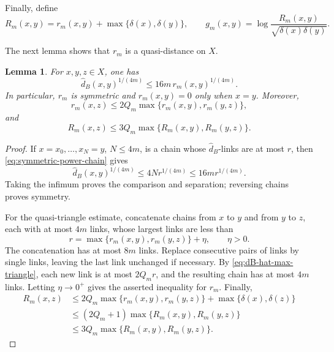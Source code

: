 \documentclass[11pt]{article}
\newtheorem{lemma}[theorem]{Lemma}
\theoremstyle{definition}
\begin{document}
Finally, define
\[
R_m(x,y)
=
r_m(x,y)+\max\{\delta(x),\delta(y)\},
\qquad
g_m(x,y)
=
\log\frac{R_m(x,y)}
{\sqrt{\delta(x)\delta(y)}}.
\]

The next lemma shows that \(r_m\)  is a quasi-distance on \(X\).



\begin{lemma}\label{lem:chain-estimates}
For \(x,y,z\in X\), one has
\[
\widehat d_B(x,y)^{1/(4m)}
\le16m\,r_m(x,y)^{1/(4m)}.
\]
In particular, \(r_m\) is symmetric and \(r_m(x,y)=0\) only when \(x=y\).
Moreover,
\[
r_m(x,z)\le2Q_m\max\{r_m(x,y),r_m(y,z)\},
\]
and
\[
R_m(x,z)\le3Q_m\max\{R_m(x,y),R_m(y,z)\}.
\]
\end{lemma}
\begin{proof}
If \(x=x_0,\ldots,x_N=y\), \(N\le4m\), is a chain whose
\(\widehat d_B\)-links are at most \(r\), then
\eqref{eq:symmetric-power-chain} gives
\[
\widehat d_B(x,y)^{1/(4m)}
\le4N r^{1/(4m)}\le16m r^{1/(4m)}.
\]
Taking the infimum proves the comparison and separation; reversing
chains proves symmetry.

For the quasi-triangle estimate, concatenate chains from \(x\) to \(y\)
and from \(y\) to \(z\), each with at most \(4m\) links, whose largest
links are less than
\[
r=\max\{r_m(x,y),r_m(y,z)\}+\eta,\qquad \eta>0.
\]
The concatenation has at most \(8m\) links. Replace consecutive pairs
of links by single links, leaving the last link unchanged if necessary.
By \eqref{eq:dB-hat-max-triangle}, each new link is at most \(2Q_mr\),
and the resulting chain has at most \(4m\) links. Letting \(\eta\to0^+\)
gives the asserted inequality for \(r_m\).
Finally,
\[
\begin{aligned}
R_m(x,z)
&\le2Q_m\max\{r_m(x,y),r_m(y,z)\}
+\max\{\delta(x),\delta(z)\}\\
&\le(2Q_m+1)\max\{R_m(x,y),R_m(y,z)\}\\
&\le3Q_m\max\{R_m(x,y),R_m(y,z)\}.
\end{aligned}
\]
\end{proof}
\end{document}
